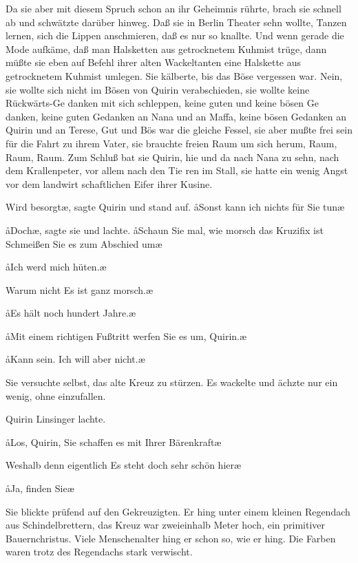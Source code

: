 Da sie aber mit diesem Spruch schon an ihr Geheimnis rührte,
brach sie schnell ab und schwätzte darüber hinweg. Daß sie in
Berlin Theater sehn wollte, Tanzen lernen, sich die Lippen
anschmieren, daß es nur so knallte. Und wenn gerade die Mode
aufkäme, daß man Halsketten aus getrocknetem Kuhmist trüge,
dann müßte sie eben auf Befehl ihrer alten Wackeltanten eine
Halskette aus getrocknetem Kuhmist umlegen. Sie kälberte,
bis das Böse vergessen war. Nein, sie wollte sich nicht im Bösen
von Quirin verabschieden, sie wollte keine Rückwärts-Ge\-%
danken mit sich schleppen, keine guten und keine bösen Ge\-%
danken, keine guten Gedanken an Nana und an Maffa, keine
bösen Gedanken an Quirin und an Terese, Gut und Bös war
die gleiche Fessel, sie aber mußte frei sein für die Fahrt zu
ihrem Vater, sie brauchte freien Raum um sich herum, Raum,
Raum, Raum. Zum Schluß bat sie Quirin, hie und da nach
Nana zu sehn, nach dem Krallenpeter, vor allem nach den Tie\-%
ren im Stall, sie hatte ein wenig Angst vor dem landwirt\-%
schaftlichen Eifer ihrer Kusine.

\aanah{}Wird besorgt\ae{}, sagte Quirin und stand auf. \aa{}Sonst kann ich
nichts für Sie tun\frag{}\ae{}

\aa{}Doch\ae{}, sagte sie und lachte. \aa{}Schaun Sie mal, wie morsch
das Kruzifix ist\ausr{} Schmeißen Sie es zum Abschied um\ausr{}\ae{}

\aa{}Ich werd mich hüten.\ae{}

\aanah{}Warum nicht\frag{} Es ist ganz morsch.\ae{}

\aa{}Es hält noch hundert Jahre.\ae{}

\aa{}Mit einem richtigen Fußtritt werfen Sie es um, Quirin.\ae{}

\aa{}Kann sein. Ich will aber nicht.\ae{}

Sie versuchte selbst, das alte Kreuz zu stürzen. Es wackelte
und ächzte nur ein wenig, ohne einzufallen.

Quirin Linsinger lachte.

\aa{}Los, Quirin, Sie schaffen es mit Ihrer Bärenkraft\ausr{}\ae{}

\aanah{}Weshalb denn eigentlich\frag{} Es steht doch sehr schön hier\frag{}\ae{}

\aa{}Ja, finden Sie\frag{}\ae{}

Sie blickte prüfend auf den Gekreuzigten. Er hing unter einem
kleinen Regendach aus Schindelbrettern, das Kreuz war
zweieinhalb Meter hoch, ein primitiver Bauernchristus. Viele
Menschenalter hing er schon so, wie er hing. Die Farben
waren trotz des Regendachs stark verwischt.

